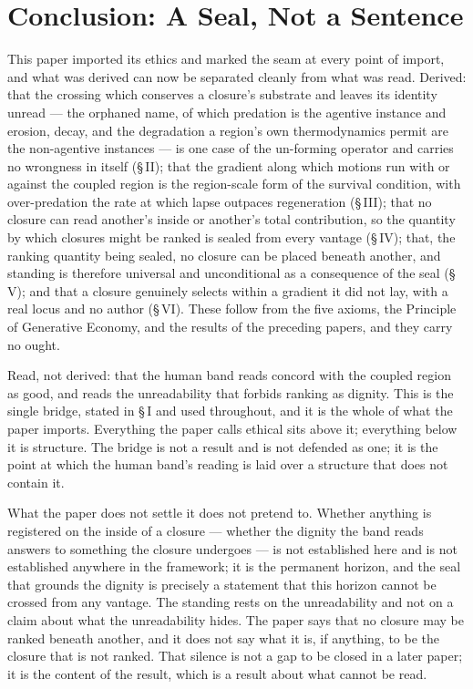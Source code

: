 \documentclass[11pt,oneside]{report}
\theoremstyle{definition}
\theoremstyle{remark}
\begin{document}
\section*{Conclusion: A Seal, Not a Sentence}

This paper imported its ethics and marked the seam at every point of import, and what was derived can now be separated cleanly from what was read. Derived: that the crossing which conserves a closure's substrate and leaves its identity unread --- the orphaned name, of which predation is the agentive instance and erosion, decay, and the degradation a region's own thermodynamics permit are the non-agentive instances --- is one case of the un-forming operator and carries no wrongness in itself (\S\,II); that the gradient along which motions run with or against the coupled region is the region-scale form of the survival condition, with over-predation the rate at which lapse outpaces regeneration (\S\,III); that no closure can read another's inside or another's total contribution, so the quantity by which closures might be ranked is sealed from every vantage (\S\,IV); that, the ranking quantity being sealed, no closure can be placed beneath another, and standing is therefore universal and unconditional as a consequence of the seal (\S\,V); and that a closure genuinely selects within a gradient it did not lay, with a real locus and no author (\S\,VI). These follow from the five axioms, the Principle of Generative Economy, and the results of the preceding papers, and they carry no ought.

Read, not derived: that the human band reads concord with the coupled region as good, and reads the unreadability that forbids ranking as dignity. This is the single bridge, stated in \S\,I and used throughout, and it is the whole of what the paper imports. Everything the paper calls ethical sits above it; everything below it is structure. The bridge is not a result and is not defended as one; it is the point at which the human band's reading is laid over a structure that does not contain it.

What the paper does not settle it does not pretend to. Whether anything is registered on the inside of a closure --- whether the dignity the band reads answers to something the closure undergoes --- is not established here and is not established anywhere in the framework; it is the permanent horizon, and the seal that grounds the dignity is precisely a statement that this horizon cannot be crossed from any vantage. The standing rests on the unreadability and not on a claim about what the unreadability hides. The paper says that no closure may be ranked beneath another, and it does not say what it is, if anything, to be the closure that is not ranked. That silence is not a gap to be closed in a later paper; it is the content of the result, which is a result about what cannot be read.
\end{document}
